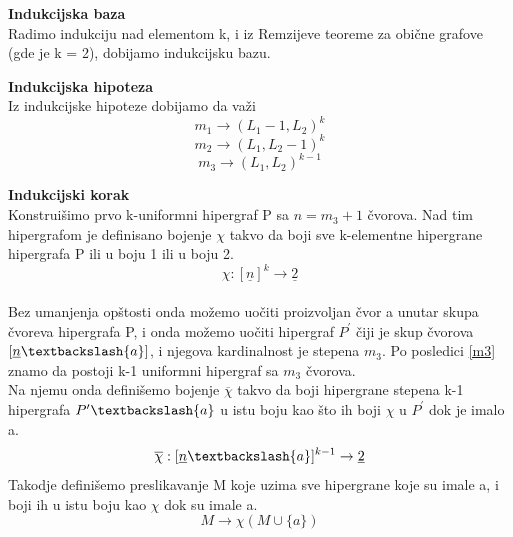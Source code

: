 \documentclass[a4paper]{article}
\begin{document}
	\begin{description}
		\item \textbf{Indukcijska baza} \\
		Radimo indukciju nad elementom k, i iz Remzijeve teoreme za obične grafove (gde je k = 2), dobijamo indukcijsku bazu. 
		\item \textbf{Indukcijska hipoteza}\\
		Iz indukcijske hipoteze dobijamo da važi
		\begin{equation}\label{m1}
		m_{1} \rightarrow (L_1 - 1, L_2)^k		
		\end{equation}
		\begin{equation}\label{m2}
		m_{2} \rightarrow (L_1, L_2 -1)^k		
		\end{equation}
		\begin{equation}\label{m3}
		m_{3} \rightarrow (L_1, L_2)^{k-1}		
		\end{equation}
		\item \textbf{Indukcijski korak}\\	
		Konstruišimo prvo k-uniformni hipergraf P sa $n = m_3 + 1$ čvorova. Nad tim hipergrafom je definisano bojenje $\chi$ takvo da boji sve k-elementne hipergrane hipergrafa P ili u boju 1 ili u boju 2.\begin{equation}
			\chi : [ \underline{n} ]^k  \rightarrow \underline{2}
		\end{equation} \\
		Bez umanjenja opštosti onda možemo uočiti proizvoljan čvor a unutar skupa čvoreva hipergrafa P, i onda možemo uočiti hipergraf $P^\prime$ čiji je skup čvorova $[\underline{n} \textbackslash \{ a \}]$, i njegova kardinalnost je stepena $m_3$. Po posledici \ref{m3} znamo da postoji k-1 uniformni hipergraf sa $m_3$ čvorova. %
		\\
		Na njemu onda definišemo bojenje $\overline{\chi}$ takvo da boji hipergrane stepena k-1 hipergrafa $P^\prime \textbackslash \{ a \}$ u istu boju kao što ih boji  $\chi$ u $P^\prime$ dok je imalo a.
		\begin{equation}
			\overline{\chi} : [ \underline{n} \textbackslash \{a\} ]^{k-1}  \rightarrow \underline{2}
		\end{equation} %
		Takodje definišemo preslikavanje M koje uzima sve hipergrane koje su imale a, i boji ih u istu boju kao $\chi$ dok su imale a.
		\begin{equation}
			M \rightarrow \chi (M \cup \{a\})
		\end{equation}
		\\

\end{description}
\end{document}

